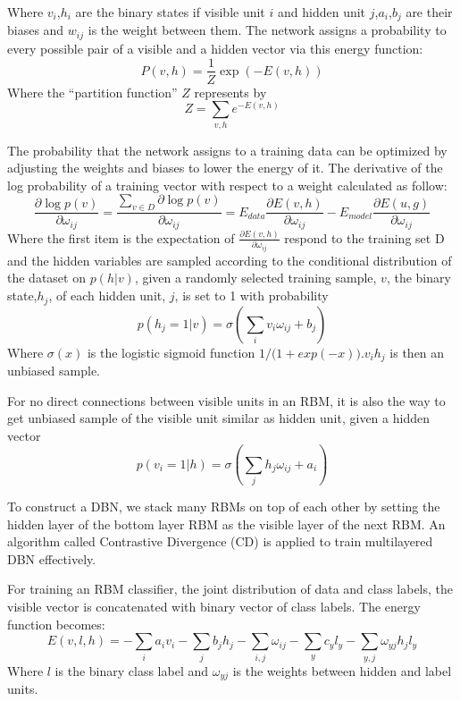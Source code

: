 \documentclass{llncs}
\begin{document}
Where $v_i$,$h_i$ are the binary states if visible unit $i$ and hidden unit $j$,$a_i$,$b_j$ are their biases and $w_{ij}$ is the weight between them. The network assigns a probability to every possible pair of a visible and a hidden vector via this energy function:
\begin{equation}
  P(v,h)=\frac{1}{Z}\exp(-E(v,h))
\end{equation}
Where the “partition function” $Z$ represents by
\begin{equation}
 Z=\sum_{v,h}e^{-E(v,h)}
\end{equation}


The probability that the network assigns to a training data can be optimized by adjusting the
weights and biases to lower the energy of it. The derivative of the log probability of a training vector with respect to a weight calculated as follow:
\begin{equation}
\frac{\partial \log p(v)}{\partial \omega_{ij}}
=\frac{\sum_{v \in D}\partial \log p(v)}{\partial \omega_{ij}}
=E_{data}\frac{\partial E(v,h)}{\partial \omega_{ij}}-
E_{model}\frac{\partial E(u,g)}{\partial \omega_{ij}}
\end{equation}
Where the first item is the expectation of $\frac{\partial E(v,h)}{\partial \omega_{ij}}$ respond to the training set D and the hidden variables are sampled according to the conditional distribution of the dataset on $p(h|v)$, given a randomly selected training sample, $v$, the binary state,$h_j$, of each hidden unit, $j$, is set to 1 with probability
\begin{equation}
 p(h_j=1|v)=\sigma(\sum_{i}v_i\omega_{ij}+b_j)
\end{equation}
Where $\sigma(x)$ is the logistic sigmoid function ${1}/{(1+exp{(-x))}}$.$v_ih_j$ is then an unbiased sample.


For no direct connections between visible units in an RBM, it is also the way to get unbiased sample of the visible unit similar as hidden unit, given a hidden vector
\begin{equation}
 p(v_i=1|h)=\sigma(\sum_{j}h_j\omega_{ij}+a_i)
\end{equation}

                                          
To construct a DBN, we stack many RBMs on top of each other by setting the hidden layer of the bottom layer RBM as the visible layer of the next RBM. An algorithm called Contrastive Divergence (CD) is applied to train multilayered DBN effectively\cite{5}.


For training an RBM classifier, the joint distribution of data and class labels, the visible vector is concatenated with binary vector of class labels. The energy function becomes:
\begin{equation}
 E(v,l,h)=-\sum_i a_iv_i - \sum_j b_jh_j - \sum_{i,j} \omega_{ij} - \sum_y c_yl_y -\sum_{y,j} \omega_{yj}h_jl_y
\end{equation}
Where $l$ is the binary class label and $\omega_{yj}$ is the weights between hidden and label units.
\end{document}
